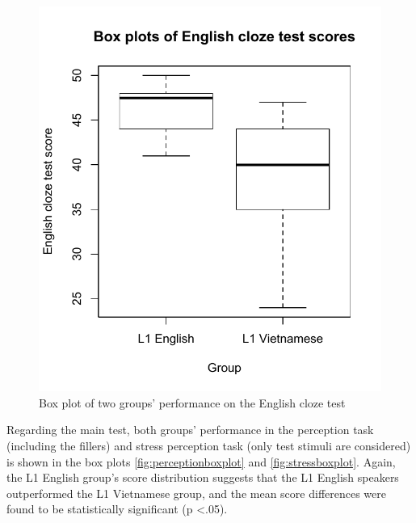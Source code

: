 \documentclass[a4paper]{article}
\begin{document}
\begin{figure}[!h]
\begin{center}  
\includegraphics[scale=0.7]{clozetestboxplot.pdf} 
\caption{Box plot of two groups' performance on the English cloze test}
\label{fig:clozeboxplot}
\end{center}   
\end{figure}




Regarding the main test, both groups' performance in the perception task (including the fillers) and stress perception task (only test stimuli are considered) is shown in the box plots \ref{fig:perceptionboxplot} and \ref{fig:stressboxplot}. Again, the L1 English group's score distribution suggests that the L1 English speakers outperformed the L1 Vietnamese group, and the mean score differences were found to be statistically significant (p \textless .05).
\end{document}
